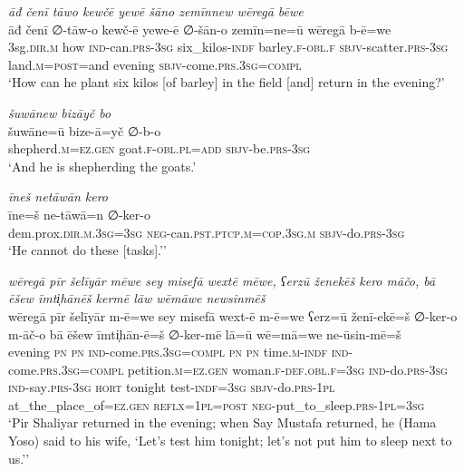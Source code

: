 \ea \label{ŽP.46}
\textit{āđ čenī tāwo kewčē yewē šāno zemīnnew wēregā bēwe} \\ 
\gll āđ čenī ∅-tāw-o kewč-ē yewe-ē ∅-šān-o zemīn=ne=ū wēregā b-ē=we \\ 
 3sg\textsc{.dir}\textsc{.m} how \textsc{ind-}can\textsc{.prs}\textsc{-3sg} six\_kilos\textsc{-indf} barley\textsc{.f}\textsc{-obl}\textsc{.f} \textsc{sbjv-}scatter\textsc{.prs}\textsc{-3sg} land\textsc{.m}\textsc{=\textsc{post}}=and evening \textsc{sbjv-}come\textsc{.prs}\textsc{.3sg}\textsc{=compl} \\ 
\glt `How can he plant six kilos [of barley] in the field [and] return in the evening?'
\z 
 
\ea \label{ŽP.48}
\textit{šuwānew bizāyč bo} \\ 
\gll šuwāne=ū bize-ā=yč ∅-b-o \\ 
 shepherd\textsc{.m}\textsc{\textsc{=ez.gen}} goat\textsc{.f}\textsc{-obl}\textsc{.pl}\textsc{=add} \textsc{sbjv-}be\textsc{.prs}\textsc{-3sg} \\ 
\glt `And he is shepherding the goats.'
\z 
 
\ea \label{ŽP.49}
\textit{īneš netāwān kero} \\ 
\gll īne=š ne-tāwā=n ∅-ker-o \\ 
 dem.prox\textsc{.dir}\textsc{.m}\textsc{.3sg}\textsc{=3sg} \textsc{neg-}can\textsc{.pst}\textsc{.ptcp}\textsc{.m}\textsc{=cop}\textsc{.3sg}\textsc{.m} \textsc{sbjv-}do\textsc{.prs}\textsc{-3sg} \\ 
\glt `He cannot do these [tasks].’'
\z 
 
\ea \label{ŽP.62}
\textit{wēregā pīr šelīyār mēwe sey misefā wextē mēwe, ʕerzū ženekēš kero māčo, bā ēšew īmti̩hānēš kermē lāw wēmāwe newsinmēš} \\ 
\gll wēregā pīr šelīyār m-ē=we sey misefā wext-ē m-ē=we ʕerz=ū ženī-ekē=š ∅-ker-o m-āč-o bā ēšew īmti̩hān-ē=š ∅-ker-mē lā=ū wē=mā=we ne-ūsin-mē=š \\ 
 evening \textsc{pn} \textsc{pn} \textsc{ind-}come\textsc{.prs}\textsc{.3sg}\textsc{=compl} \textsc{pn} \textsc{pn} time\textsc{.m}\textsc{-indf} \textsc{ind-}come\textsc{.prs}\textsc{.3sg}\textsc{=compl} petition\textsc{.m}\textsc{\textsc{=ez.gen}} woman\textsc{.f}\textsc{-def}\textsc{.obl}\textsc{.f}\textsc{=3sg} \textsc{ind-}do\textsc{.prs}\textsc{-3sg} \textsc{ind-}say\textsc{.prs}\textsc{-3sg} \textsc{hort} tonight test\textsc{-indf}\textsc{=3sg} \textsc{sbjv-}do\textsc{.prs}\textsc{-1pl} at\_the\_place\_of\textsc{\textsc{=ez.gen}} \textsc{reflx}\textsc{=1pl}\textsc{=\textsc{post}} \textsc{neg-}put\_to\_sleep\textsc{.prs}\textsc{-1pl}\textsc{=3sg} \\ 
\glt `Pir Shaliyar returned in the evening; when Say Mustafa returned, he (Hama Yoso) said to his wife, ‘Let’s test him tonight; let’s not put him to sleep next to us.’'
\z 
 
